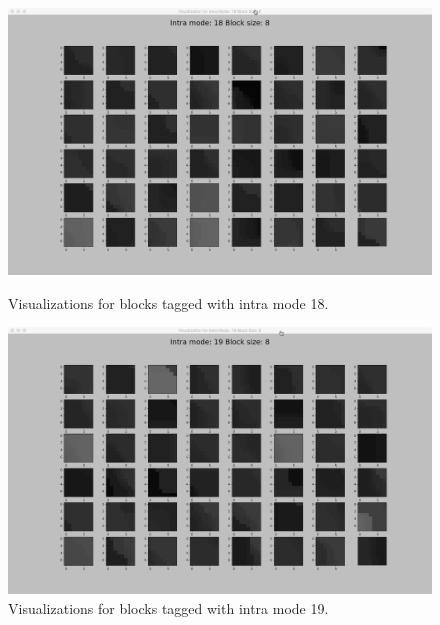 \begin{figure}
        \vspace*{1cm} %
    
        \begin{minipage}{0.49\textwidth}
            \includegraphics[width=\linewidth]{Figures/visu-size8x8/8-18}
            \caption[Visualizations for blocks tagged with intra mode 18]{Visualizations for blocks tagged with intra mode 18.}
            \label{fig:size8_mode18}
        \end{minipage}
        \hspace{\fill} %
        \begin{minipage}{0.49\textwidth}
            \includegraphics[width=\linewidth]{Figures/visu-size8x8/8-19}
            \caption[Visualizations for blocks tagged with intra mode 19]{Visualizations for blocks tagged with intra mode 19.}
            \label{fig:size8_mode19}
        \end{minipage}
        

\end{figure}

